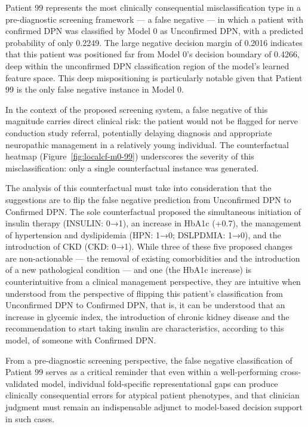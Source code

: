 \documentclass[pdflatex,sn-vancouver-num]{sn-jnl}
\begin{document}
Patient 99 represents the most clinically consequential misclassification type in a pre-diagnostic screening framework — a false negative — in which a patient with confirmed DPN was classified by Model 0 as Unconfirmed DPN, with a predicted probability of only 0.2249. The large negative decision margin of 0.2016  indicates that this patient was positioned far from Model 0's decision boundary of 0.4266, deep within the unconfirmed DPN classification region of the model's learned feature space. This deep mispositioning is particularly notable given that Patient 99 is the only false negative instance in Model 0.   

In the context of the proposed screening system, a false negative of this magnitude carries direct clinical risk: the patient would not be flagged for nerve conduction study referral, potentially delaying diagnosis and appropriate neuropathic management in a relatively young individual. The counterfactual heatmap (Figure~\ref{fig:localcf-m0-99}) underscores the severity of this misclassification: only a single counterfactual instance was generated.  

The analysis of this counterfactual must take into consideration that the suggestions are to flip the false negative prediction from Unconfirmed DPN to Confirmed DPN. The sole counterfactual proposed the simultaneous initiation of insulin therapy (INSULIN: 0→1), an increase in HbA1c (+0.7), the management of hypertension and dyslipidemia (HPN: 1→0; DSLPDMIA: 1→0), and the introduction of CKD (CKD: 0→1). While three of these five proposed changes are non-actionable — the removal of existing comorbidities and the introduction of a new pathological condition — and one (the HbA1c increase) is counterintuitive from a clinical management perspective, they are intuitive when understood from the perspective of flipping this patient's classification from Unconfirmed DPN to Confirmed DPN, that is, it can be understood that an increase in glycemic index, the introduction of chronic kidney disease and the recommendation to start taking insulin are characteristics, according to this model, of someone with Confirmed DPN. 

From a pre-diagnostic screening perspective, the false negative classification of Patient 99 serves as a critical reminder that even within a well-performing cross-validated model, individual fold-specific representational gaps can produce clinically consequential errors for atypical patient phenotypes, and that clinician judgment must remain an indispensable adjunct to model-based decision support in such cases.
\end{document}

